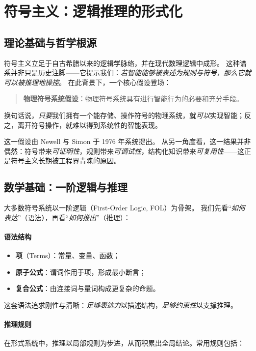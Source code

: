 \section{符号主义：逻辑推理的形式化}

\subsection{理论基础与哲学根源}

符号主义立足于自古希腊以来的逻辑学脉络，并在现代数理逻辑中成形。  
这种谱系并非只是历史注脚——它提示我们：\emph{若智能能够被表述为规则与符号，那么它就可以被推理地操控}。  
在此背景下，一个核心假设登场：

\begin{quote}
\textbf{物理符号系统假设}：物理符号系统具有进行智能行为的必要和充分手段。
\end{quote}
换句话说，\emph{只要}我们拥有一个能存储、操作符号的物理系统，就\emph{可以}实现智能；反之，离开符号操作，就难以得到系统性的智能表现。

这一假设由 Newell 与 Simon 于 1976 年系统提出。  
从另一角度看，这一结果并非偶然：符号带来\emph{可证明性}，规则带来\emph{可调试性}，结构化知识带来\emph{可复用性}——这正是符号主义长期被工程界青睐的原因。

\subsection{数学基础：一阶逻辑与推理}

大多数符号系统以一阶逻辑（First-Order Logic, FOL）为骨架。  
我们先看“\emph{如何表达}”（语法），再看“\emph{如何推出}”（推理）：

\paragraph{语法结构}
\begin{itemize}
\item \textbf{项}（Terms）：常量、变量、函数；
\item \textbf{原子公式}：谓词作用于项，形成最小断言；
\item \textbf{复合公式}：由连接词与量词构成更复杂的命题。
\end{itemize}
这套语法追求刚性与清晰：\emph{足够表达力}以描述结构，\emph{足够约束性}以支撑推理。

\paragraph{推理规则}
在形式系统中，推理以局部规则为步进，从而积累出全局结论。常用规则包括：

